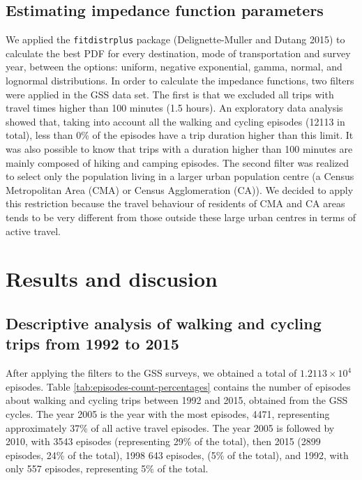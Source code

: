\documentclass[preprint, 3p,
authoryear]{elsarticle} %
\begin{document}
\hypertarget{estimating-impedance-function-parameters}{%
\subsection{Estimating impedance function
parameters}\label{estimating-impedance-function-parameters}}

We applied the \texttt{fitdistrplus} package (Delignette-Muller and
Dutang 2015) to calculate the best PDF for every destination, mode of
transportation and survey year, between the options: uniform, negative
exponential, gamma, normal, and lognormal distributions. In order to
calculate the impedance functions, two filters were applied in the GSS
data set. The first is that we excluded all trips with travel times
higher than 100 minutes (1.5 hours). An exploratory data analysis showed
that, taking into account all the walking and cycling episodes (12113 in
total), less than 0\% of the episodes have a trip duration higher than
this limit. It was also possible to know that trips with a duration
higher than 100 minutes are mainly composed of hiking and camping
episodes. The second filter was realized to select only the population
living in a larger urban population centre (a Census Metropolitan Area
(CMA) or Census Agglomeration (CA)). We decided to apply this
restriction because the travel behaviour of residents of CMA and CA
areas tends to be very different from those outside these large urban
centres in terms of active travel.

\hypertarget{results-and-discusion}{%
\section{Results and discusion}\label{results-and-discusion}}

\hypertarget{descriptive-analysis-of-walking-and-cycling-trips-from-1992-to-2015}{%
\subsection{Descriptive analysis of walking and cycling trips from 1992
to
2015}\label{descriptive-analysis-of-walking-and-cycling-trips-from-1992-to-2015}}

After applying the filters to the GSS surveys, we obtained a total of
\ensuremath{1.2113\times 10^{4}} episodes. Table
\ref{tab:episodes-count-percentages} contains the number of episodes
about walking and cycling trips between 1992 and 2015, obtained from the
GSS cycles. The year 2005 is the year with the most episodes, 4471,
representing approximately 37\% of all active travel episodes. The year
2005 is followed by 2010, with 3543 episodes (representing 29\% of the
total), then 2015 (2899 episodes, 24\% of the total), 1998 643 episodes,
(5\% of the total), and 1992, with only 557 episodes, representing 5\%
of the total.
\end{document}
